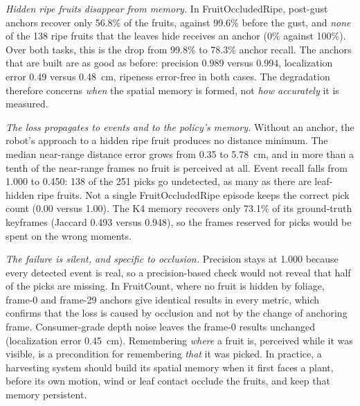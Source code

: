 \emph{Hidden ripe fruits disappear from memory.} In FruitOccludedRipe, post-gust anchors recover only 56.8\% of the fruits, against 99.6\% before the gust, and \emph{none} of the 138 ripe fruits that the leaves hide receives an anchor (0\% against 100\%). Over both tasks, this is the drop from 99.8\% to 78.3\% anchor recall. The anchors that are built are as good as before: precision 0.989 versus 0.994, localization error 0.49 versus 0.48~cm, ripeness error-free in both cases. The degradation therefore concerns \emph{when} the spatial memory is formed, not \emph{how accurately} it is measured.

\emph{The loss propagates to events and to the policy's memory.} Without an anchor, the robot's approach to a hidden ripe fruit produces no distance minimum. The median near-range distance error grows from 0.35 to 5.78~cm, and in more than a tenth of the near-range frames no fruit is perceived at all. Event recall falls from 1.000 to 0.450: 138 of the 251 picks go undetected, as many as there are leaf-hidden ripe fruits. Not a single FruitOccludedRipe episode keeps the correct pick count (0.00 versus 1.00). The K4 memory recovers only 73.1\% of its ground-truth keyframes (Jaccard 0.493 versus 0.948), so the frames reserved for picks would be spent on the wrong moments.

\emph{The failure is silent, and specific to occlusion.} Precision stays at 1.000 because every detected event is real, so a precision-based check would not reveal that half of the picks are missing. In FruitCount, where no fruit is hidden by foliage, frame-0 and frame-29 anchors give identical results in every metric, which confirms that the loss is caused by occlusion and not by the change of anchoring frame. Consumer-grade depth noise leaves the frame-0 results unchanged (localization error 0.45~cm). Remembering \emph{where} a fruit is, perceived while it was visible, is a precondition for remembering \emph{that} it was picked. In practice, a harvesting system should build its spatial memory when it first faces a plant, before its own motion, wind or leaf contact occlude the fruits, and keep that memory persistent.

